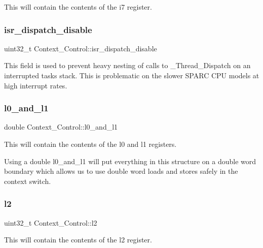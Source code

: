 This will contain the contents of the i7 register. \mbox{\label{structContext__Control_a196f35e6231db08d04f65933b8a95ea5}} 
\subsubsection{\texorpdfstring{isr\_dispatch\_disable}{isr\_dispatch\_disable}}
{\footnotesize\ttfamily uint32\+\_\+t Context\+\_\+\+Control\+::isr\+\_\+dispatch\+\_\+disable}

This field is used to prevent heavy nesting of calls to \+\_\+\+Thread\+\_\+\+Dispatch on an interrupted task\textquotesingle{}s stack. This is problematic on the slower S\+P\+A\+RC C\+PU models at high interrupt rates. \mbox{\label{structContext__Control_afc207fb711f43063d17b4852ad23246c}} 
\subsubsection{\texorpdfstring{l0\_and\_l1}{l0\_and\_l1}}
{\footnotesize\ttfamily double Context\+\_\+\+Control\+::l0\+\_\+and\+\_\+l1}

This will contain the contents of the l0 and l1 registers.

Using a double l0\+\_\+and\+\_\+l1 will put everything in this structure on a double word boundary which allows us to use double word loads and stores safely in the context switch. \mbox{\label{structContext__Control_a7fce1778c1c286dd2f8ef6c17f9c5d59}} 
\subsubsection{\texorpdfstring{l2}{l2}}
{\footnotesize\ttfamily uint32\+\_\+t Context\+\_\+\+Control\+::l2}

This will contain the contents of the l2 register. \mbox{\label{structContext__Control_a67bf8ead9eeeb816ec4adabf6d10b1ea}} 
